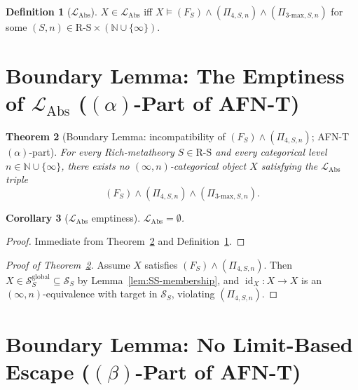 \documentclass[11pt]{article}
\theoremstyle{plain}
\newtheorem{theorem}{Theorem}[section]
\newtheorem{corollary}[theorem]{Corollary}
\theoremstyle{definition}
\newtheorem{definition}[theorem]{Definition}
\newcommand{\RS}{\mathrm{R\text{-}S}}
\newcommand{\cS}{\mathcal{S}}
\newcommand{\LAbs}{\mathcal{L}_{\mathrm{Abs}}}
\DeclareMathOperator{\id}{id}
\begin{document}
\begin{definition}[$\LAbs$]\label{def:level6}
$X \in \LAbs$ iff $X \models (F_S) \wedge (\Pi_{4, S, n}) \wedge (\Pi_{3\text{-max}, S, n})$ for some $(S, n) \in \RS \times (\mathbb{N} \cup \{\infty\})$.
\end{definition}

\section{\texorpdfstring{Boundary Lemma: The Emptiness of $\LAbs$ ($(\alpha)$-Part of AFN-T)}{Boundary Lemma: The Emptiness of L\_Abs ((alpha)-Part of AFN-T)}}\label{sec:afnt-alpha}

\begin{theorem}[Boundary Lemma: incompatibility of $(F_S) \wedge (\Pi_{4, S, n})$; AFN-T $(\alpha)$-part]\label{thm:afnt-alpha}
For every Rich-metatheory $S \in \RS$ and every categorical level $n \in \mathbb{N} \cup \{\infty\}$, there exists no $(\infty, n)$-categorical object $X$ satisfying the $\LAbs$ triple
\[
(F_S) \wedge (\Pi_{4, S, n}) \wedge (\Pi_{3\text{-max}, S, n}).
\]
\end{theorem}

\begin{corollary}[$\LAbs$ emptiness]\label{cor:level6-empty-alpha}
$\LAbs = \emptyset$.
\end{corollary}

\begin{proof}
Immediate from Theorem~\ref{thm:afnt-alpha} and Definition~\ref{def:level6}.
\end{proof}

\begin{proof}[Proof of Theorem~\ref{thm:afnt-alpha}]
Assume $X$ satisfies $(F_S) \wedge (\Pi_{4, S, n})$. Then $X \in \cS_S^{\mathrm{global}} \subseteq \cS_S$ by Lemma~\ref{lem:SS-membership}, and $\id_X : X \to X$ is an $(\infty, n)$-equivalence with target in $\cS_S$, violating $(\Pi_{4, S, n})$.
\end{proof}

\section{\texorpdfstring{Boundary Lemma: No Limit-Based Escape ($(\beta)$-Part of AFN-T)}{Boundary Lemma: No Limit-Based Escape ((beta)-Part of AFN-T)}}\label{sec:afnt-beta}
\end{document}
